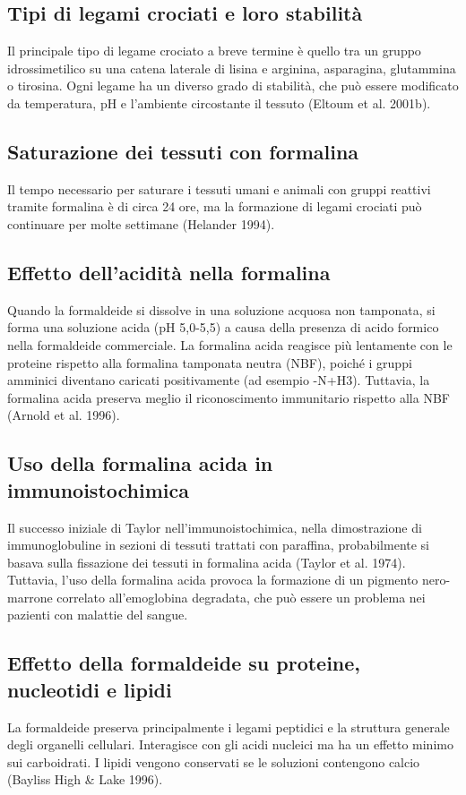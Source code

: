 \subsection{Tipi di legami crociati e loro stabilità}
Il principale tipo di legame crociato a breve termine è quello tra un gruppo idrossimetilico su una catena laterale di lisina e arginina, asparagina, glutammina o tirosina. Ogni legame ha un diverso grado di stabilità, che può essere modificato da temperatura, pH e l'ambiente circostante il tessuto (Eltoum et al. 2001b).

\subsection{Saturazione dei tessuti con formalina}
Il tempo necessario per saturare i tessuti umani e animali con gruppi reattivi tramite formalina è di circa 24 ore, ma la formazione di legami crociati può continuare per molte settimane (Helander 1994).

\subsection{Effetto dell'acidità nella formalina}
Quando la formaldeide si dissolve in una soluzione acquosa non tamponata, si forma una soluzione acida (pH 5,0-5,5) a causa della presenza di acido formico nella formaldeide commerciale. La formalina acida reagisce più lentamente con le proteine rispetto alla formalina tamponata neutra (NBF), poiché i gruppi amminici diventano caricati positivamente (ad esempio -N+H3). Tuttavia, la formalina acida preserva meglio il riconoscimento immunitario rispetto alla NBF (Arnold et al. 1996).

\subsection{Uso della formalina acida in immunoistochimica}
Il successo iniziale di Taylor nell'immunoistochimica, nella dimostrazione di immunoglobuline in sezioni di tessuti trattati con paraffina, probabilmente si basava sulla fissazione dei tessuti in formalina acida (Taylor et al. 1974). Tuttavia, l'uso della formalina acida provoca la formazione di un pigmento nero-marrone correlato all'emoglobina degradata, che può essere un problema nei pazienti con malattie del sangue.

\subsection{Effetto della formaldeide su proteine, nucleotidi e lipidi}
La formaldeide preserva principalmente i legami peptidici e la struttura generale degli organelli cellulari. Interagisce con gli acidi nucleici ma ha un effetto minimo sui carboidrati. I lipidi vengono conservati se le soluzioni contengono calcio (Bayliss High \& Lake 1996).


